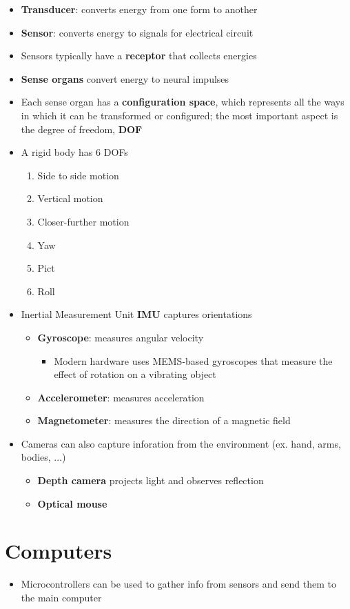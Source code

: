   \begin{itemize}
    \item \textbf{Transducer}: converts energy from one form to another
    \item \textbf{Sensor}: converts energy to signals for electrical circuit
    \item Sensors typically have a \textbf{receptor} that collects energies
    \item \textbf{Sense organs} convert energy to neural impulses
    \item Each sense organ has a \textbf{configuration space}, which represents
    all the ways in which it can be transformed or configured; the most
    important aspect is the degree of freedom, \textbf{DOF}
    \item A rigid body has 6 DOFs
    \begin{enumerate}
      \item Side to side motion
      \item Vertical motion
      \item Closer-further motion
      \item Yaw
      \item Pict
      \item Roll
    \end{enumerate}

    \item Inertial Measurement Unit \textbf{IMU} captures orientations
    \begin{itemize}
      \item \textbf{Gyroscope}: measures angular velocity
      \begin{itemize}
        \item Modern hardware uses MEMS-based gyroscopes that measure the
        effect of rotation on a vibrating object
      \end{itemize}

      \item \textbf{Accelerometer}: measures acceleration
      \item \textbf{Magnetometer}: measures the direction of a magnetic field
    \end{itemize}

    \item Cameras can also capture inforation from the environment
    (ex. hand, arms, bodies, ...)
    \begin{itemize}
      \item \textbf{Depth camera} projects light and observes reflection
      \item \textbf{Optical mouse}
    \end{itemize}
  \end{itemize}

\section{Computers}

  \begin{itemize}
    \item Microcontrollers can be used to gather info from sensors and
    send them to the main computer
  \end{itemize}

